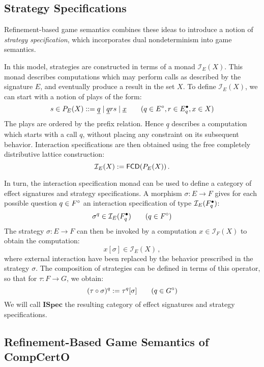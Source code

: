 \documentclass[acmsmall,review,anonymous]{acmart}\settopmatter{printfolios=true,printccs=false,printacmref=false}
\newcommand{\ISpec}{\mathbf{ISpec}}
\begin{document}

\subsection{Strategy Specifications} %

Refinement-based game semantics \cite{rbgs-cal}
combines these ideas to introduce a notion of
\emph{strategy specification},
which incorporates dual nondeterminism
into game semantics.

In this model,
strategies are constructed in terms of a monad $\mathcal{I}_E(X)$.
This monad describes computations
which may perform calls as described by the signature $E$,
and eventually produce a result in the set $X$.
To define $\mathcal{I}_E(X)$,
we can start with a notion of plays of the form:
\[
  s \in P_E(X) ::=
    \underline{q} \mid
    \underline{q}rs \mid
    \underline{x}
  \qquad
  (q \in E^\circ, r \in E^\bullet_q, x \in X)
\]
The plays are ordered by the prefix relation.
Hence $\underline{q}$ describes a computation
which starts with a call $q$,
without placing any constraint on its subsequent behavior.
Interaction specifications are then obtained
using the free completely distributive lattice construction:
\[
  \mathcal{I}_E(X) :=  \mathsf{FCD} (P_E(X)) \,.
\]

In turn,
the interaction specification monad can be used to define
a category of effect signatures and strategy specifications.
A morphism $\sigma : E \rightarrow F$
gives for each possible question $q \in F^\circ$
an interaction specification of type $\mathcal{I}_E(F^\bullet_q)$:
\[
  \sigma^q \in \mathcal{I}_E(F^\bullet_q)
  \qquad
  (q \in F^\circ)
\]
The strategy $\sigma : E \rightarrow F$
can then be invoked by a computation $x \in \mathcal{I}_F(X)$
to obtain the computation:
\[
  x[\sigma] \in \mathcal{I}_E(X) \,,
\]
where external interaction have been
replaced by the behavior prescribed in
the strategy $\sigma$.
The composition of strategies can be defined
in terms of this operator,
so that for $\tau : F \rightarrow G$,
we obtain:
\[
  (\tau \circ \sigma)^q := \tau^q[\sigma]
  \qquad
  (q \in G^\circ)
\]
We will call $\ISpec$ the resulting category
of effect signatures and strategy specifications.


\subsection{Refinement-Based Game Semantics of CompCertO} \label{sec:rbgs}
\end{document}

